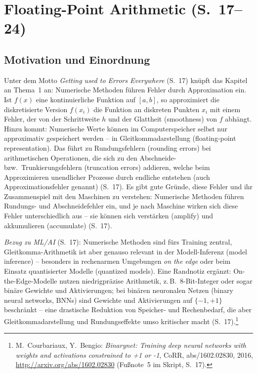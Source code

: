 \section{Floating-Point Arithmetic (S.~17--24)}

\subsection{Motivation und Einordnung}

Unter dem Motto \emph{Getting used to Errors Everywhere} (S.~17) knüpft das Kapitel an Thema~1 an: Numerische Methoden führen Fehler durch Approximation ein. Ist $f(x)$ eine kontinuierliche Funktion auf $[a,b]$, so approximiert die diskretisierte Version $f(x_i)$ die Funktion an diskreten Punkten $x_i$ mit einem Fehler, der von der Schrittweite $h$ und der Glattheit (smoothness) von $f$ abhängt. Hinzu kommt: Numerische Werte können im Computerspeicher selbst nur approximativ gespeichert werden -- in Gleitkommadarstellung (floating-point representation). Das führt zu Rundungsfehlern (rounding errors) bei arithmetischen Operationen, die sich zu den Abschneide- bzw.\ Trunkierungsfehlern (truncation errors) addieren, welche beim Approximieren unendlicher Prozesse durch endliche entstehen (auch Approximationsfehler genannt) (S.~17). Es gibt gute Gründe, diese Fehler und ihr Zusammenspiel mit den Maschinen zu verstehen: Numerische Methoden führen Rundungs- und Abschneidefehler ein, und je nach Maschine wirken sich diese Fehler unterschiedlich aus -- sie können sich verstärken (amplify) und akkumulieren (accumulate) (S.~17).

\emph{Bezug zu ML/AI} (S.~17): Numerische Methoden sind fürs Training zentral, Gleitkomma-Arithmetik ist aber genauso relevant in der Modell-Inferenz (model inference) -- besonders in rechenarmen Umgebungen \emph{on the edge} oder beim Einsatz quantisierter Modelle (quantized models). Eine Randnotiz ergänzt: On-the-Edge-Modelle nutzen niedrigpräzise Arithmetik, z.\,B.\ 8-Bit-Integer oder sogar binäre Gewichte und Aktivierungen; bei binären neuronalen Netzen (binary neural networks, BNNs) sind Gewichte und Aktivierungen auf $\{-1, +1\}$ beschränkt -- eine drastische Reduktion von Speicher- und Rechenbedarf, die aber Gleitkommadarstellung und Rundungseffekte umso kritischer macht (S.~17).\footnote{M.~Courbariaux, Y.~Bengio: \emph{Binarynet: Training deep neural networks with weights and activations constrained to +1 or -1}, CoRR, abs/1602.02830, 2016, \url{http://arxiv.org/abs/1602.02830} (Fußnote~5 im Skript, S.~17).}

